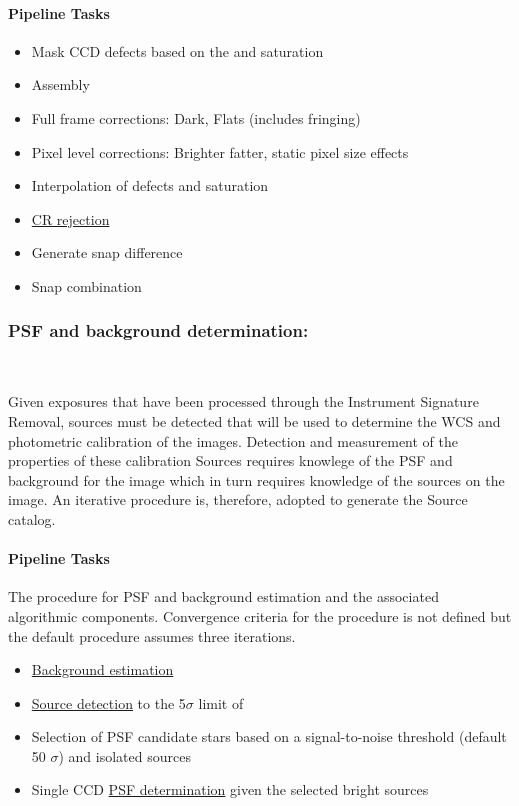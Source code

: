 \paragraph{Pipeline Tasks}
\begin{itemize}
\item Mask CCD defects based on the and saturation
\item Assembly
\item Full frame corrections: Dark, Flats (includes fringing)
\item Pixel level corrections: Brighter fatter, static pixel size effects
\item Interpolation of defects and saturation
\item \hyperref[sec:artifact]{CR rejection}
\item Generate snap difference
\item Snap combination
\end{itemize}


\subsubsection{PSF and background determination:}~
\label{sec:apPSFBackground}

Given exposures that have been processed through the Instrument Signature Removal, sources must be detected that will be used to determine the WCS and photometric calibration of the images. Detection and measurement of the properties of these calibration Sources requires knowlege of the PSF and background for the image which in turn requires knowledge of the sources on the image. An iterative procedure is, therefore, adopted to generate the Source catalog. 

\paragraph{Pipeline Tasks}
The procedure for PSF and background estimation and the associated
algorithmic components. Convergence criteria for the procedure is not
defined but the default procedure assumes three iterations.
\begin{itemize}
\item \hyperref[sec:acBackgroundEstimation]{Background estimation}
\item \hyperref[sec:acSourceDetection]{Source detection} to the 5$\sigma$ limit of
\item Selection of PSF candidate stars based on a signal-to-noise threshold 
  (default 50 $\sigma$) and isolated sources 
\item Single CCD \hyperref[sec:acSingleCCDPSF]{PSF determination} given the selected bright sources
\end{itemize}


